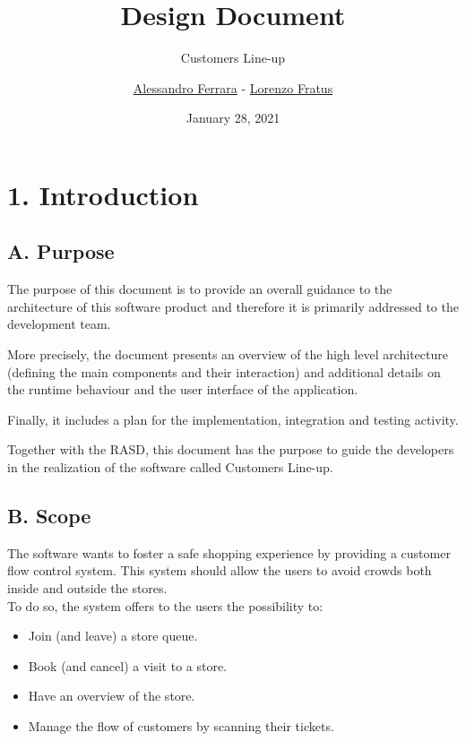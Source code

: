 
\graphicspath{ {assets/dd/} }

\title{Design Document}
\subtitle{Customers Line-up}
\author{\href{https://github.com/ferrohd}{Alessandro Ferrara} -
\href{https://github.com/lorenzofratus}{Lorenzo Fratus}}
\date{January 28, 2021}



\maketitle

\tableofcontents

\chapter{1. Introduction}

\section{A. Purpose}

The purpose of this document is to provide an overall guidance to the architecture of this software product and therefore it is primarily addressed to the development team.

More precisely, the document presents an overview of the high level architecture (defining the main components and their interaction) and additional details on the runtime behaviour and the user interface of the application.

Finally, it includes a plan for the implementation, integration and testing activity.

Together with the RASD, this document has the purpose to guide the developers in the realization of the software called Customers Line-up.

\section{B. Scope}

The software wants to foster a safe shopping experience by providing a customer flow control system. This system should allow the users to avoid crowds both inside and outside the stores.\\
To do so, the system offers to the users the possibility to:

\begin{itemize}
    \item Join (and leave) a store queue.
    \item Book (and cancel) a visit to a store.
    \item Have an overview of the store.
    \item Manage the flow of customers by scanning their tickets.
\end{itemize}

